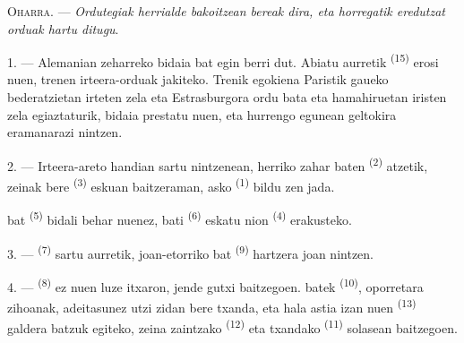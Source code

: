 %

\VUsaut{4.0mm}
\VUsaut{2.4mm}
\VUsaut{3.4mm}
\textsc{Oharra.} --- \textit{Ordutegiak herrialde bakoitzean bereak dira, eta
horregatik eredutzat}  \textit{orduak hartu ditugu}.

1. --- Alemanian zeharreko bidaia bat egin berri dut. Abiatu aurretik
 \textsuperscript{(15)} erosi nuen, trenen irteera-orduak
jakiteko. Trenik egokiena Paristik gaueko bederatzietan irteten zela eta
Estrasburgora ordu bata eta hamahiruetan iristen zela egiaztaturik, bidaia
prestatu nuen, eta hurrengo egunean geltokira eramanarazi nintzen.

2. --- Irteera-areto handian sartu nintzenean, herriko 
zahar baten \textsuperscript{(2)} atzetik, zeinak bere 
\textsuperscript{(3)} eskuan baitzeraman,  asko
\textsuperscript{(1)} bildu zen jada.

 bat \textsuperscript{(5)} bidali behar nuenez,
 bati \textsuperscript{(6)} eskatu nion
 \textsuperscript{(4)} erakusteko.

3. ---  \textsuperscript{(7)} sartu aurretik, joan-etorriko
 bat \textsuperscript{(9)} hartzera joan nintzen.

4. ---  \textsuperscript{(8)} ez nuen luze itxaron, jende
gutxi baitzegoen.  batek \textsuperscript{(10)}, oporretara
zihoanak, adeitasunez utzi zidan bere txanda, eta hala astia izan nuen
 \textsuperscript{(13)} galdera batzuk egiteko, zeina
zaintzako  \textsuperscript{(12)} eta txandako
 \textsuperscript{(11)} solasean baitzegoen.

